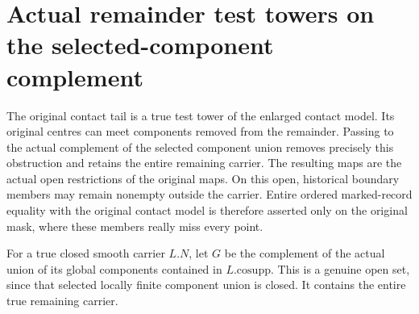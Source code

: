 \section{Actual remainder test towers on the selected-component complement}
The original contact tail is a true test tower of the enlarged contact model.
Its original centres can meet components removed from the remainder. Passing
to the actual complement of the selected component union removes precisely
this obstruction and retains the entire remaining carrier. The resulting
maps are the actual open restrictions of the original maps. On this open,
historical boundary members may remain nonempty outside the carrier. Entire
ordered marked-record equality with the original contact model is therefore
asserted only on the original mask, where these members really miss every point.

\begin{definition}
\label{hir:zero-contact-remainder-actual-open}
\leanok
{}
For a true closed smooth carrier $L.N$, let $G$ be the complement of the actual
union of its global components contained in $L.\mathrm{cosupp}$. This is a
genuine open set, since that selected locally finite component union is closed.
It contains the entire true remaining carrier.
\end{definition}

